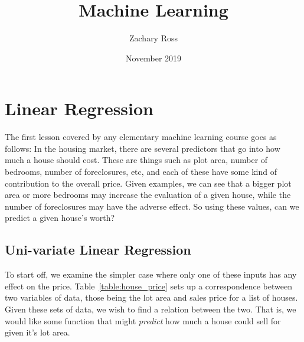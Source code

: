\documentclass{book}[a5paper]
\title{Machine Learning}
\author{Zachary Ross}
\date{November 2019}
\begin{document}
\maketitle



\chapter{Linear Regression}

The first lesson covered by any elementary machine learning course goes as
follows: In the housing market, there are several predictors that go into how
much a house should cost. These are things such as plot area, number of
bedrooms, number of foreclosures, etc, and each of these have some kind of
contribution to the overall price. Given examples, we can see that a bigger plot
area or more bedrooms may increase the evaluation of a given house, while the
number of foreclosures may have the adverse effect. So using these values, can
we predict a given house's worth?

\section{Uni-variate Linear Regression}


To start off, we examine the simpler case where only one of these inputs has any
effect on the price. Table~\ref{table:house_price} sets up a correspondence
between two variables of data, those being the lot area and sales price for a
list of houses. Given these sets of data, we wish to find a relation
between the two. That is, we would like some function that might \emph{predict}
how much a house could sell for given it's lot area.
\end{document}

